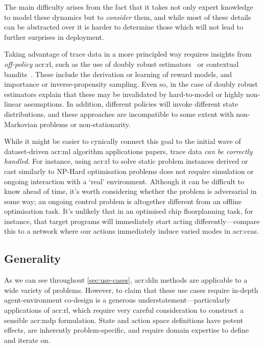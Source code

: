 The main difficulty arises from the fact that it takes not only expert knowledge to model these dynamics but to \emph{consider} them, and while most of these details can be abstracted over it is harder to determine those which will not lead to further surprises in deployment.

Taking advantage of trace data in a more principled way requires insights from \emph{off-policy} \gls{acr:rl}, such as the use of doubly robust estimators~\parencite{DBLP:conf/hotnets/BartulovicJBSS17} or contextual bandits~\parencite{DBLP:conf/hotnets/LecuyerLNSSS17}.
These include the derivation or learning of reward models, and importance or inverse-propensity sampling.
Even so, in the case of doubly robust estimators \citeauthor{DBLP:conf/hotnets/BartulovicJBSS17} explain that these may be invalidated by hard-to-model or highly non-linear assumptions.
In addition, different policies will invoke different state distributions, and these approaches are incompatible to some extent with non-Markovian problems or non-stationarity.

While it might be easier to cynically connect this goal to the initial wave of dataset-driven \gls{acr:ml} algorithm applications papers, trace data \emph{can be correctly handled}.
For instance, using \gls{acr:rl} to solve static problem instances derived or cast similarly to \textsf{NP}-Hard optimisation problems does not require simulation or ongoing interaction with a `real' environment.
Although it can be difficult to know ahead of time, it's worth considering whether the problem is adversarial in some way; an ongoing control problem is altogether different from an offline optimisation task.
It's unlikely that in an optimised chip floorplanning task, for instance, that target programs will immediately start acting differently---compare this to a network where our actions immediately induce varied modes in \glspl{acr:cca}.

\subsection{Generality}
As we can see throughout \cref{sec:use-cases}, \gls{acr:ddn} methods are applicable to a wide variety of problems.
However, to claim that these use cases require in-depth agent-environment co-design is a generous understatement---particularly applications of \gls{acr:rl}, which require very careful consideration to construct a sensible \gls{acr:mdp} formulation.
State and action space definitions have potent effects, are inherently problem-specific, and require domain expertise to define and iterate on.

